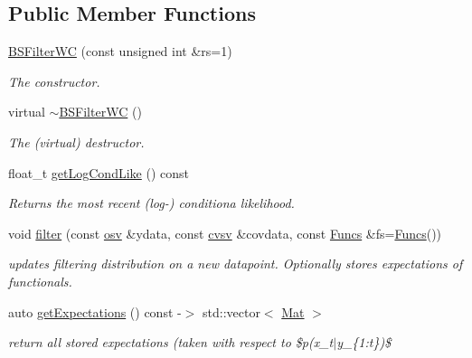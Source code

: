 \subsection*{Public Member Functions}
\begin{DoxyCompactItemize}
\item 
\hyperlink{classBSFilterWC_a8b9399d0b7008aa6bca19a87834dfd6a}{B\+S\+Filter\+WC} (const unsigned int \&rs=1)
\begin{DoxyCompactList}\small\item\em The constructor. \end{DoxyCompactList}\item 
\mbox{\label{classBSFilterWC_a125b13d2ba71b3bce05c315dea38b476}} 
virtual \hyperlink{classBSFilterWC_a125b13d2ba71b3bce05c315dea38b476}{$\sim$\+B\+S\+Filter\+WC} ()
\begin{DoxyCompactList}\small\item\em The (virtual) destructor. \end{DoxyCompactList}\item 
float\+\_\+t \hyperlink{classBSFilterWC_a26e23f7f1e17e3fb3e6a3bfdb633cc2b}{get\+Log\+Cond\+Like} () const
\begin{DoxyCompactList}\small\item\em Returns the most recent (log-\/) conditiona likelihood. \end{DoxyCompactList}\item 
void \hyperlink{classBSFilterWC_a5fcdf06edc3b5528c5c33dd2e3df9b66}{filter} (const \hyperlink{classBSFilterWC_a48b0c7f1a1cf7e57300cf820e74057ce}{osv} \&ydata, const \hyperlink{classBSFilterWC_a52f5a46901a821fffe82937543220a1a}{cvsv} \&covdata, const \hyperlink{classBSFilterWC_a984a5a75eef118f2f4db7f8953fea653}{Funcs} \&fs=\hyperlink{classBSFilterWC_a984a5a75eef118f2f4db7f8953fea653}{Funcs}())
\begin{DoxyCompactList}\small\item\em updates filtering distribution on a new datapoint. Optionally stores expectations of functionals. \end{DoxyCompactList}\item 
auto \hyperlink{classBSFilterWC_abbac1ed7a57f04ec34d389e3ac822a90}{get\+Expectations} () const -\/$>$ std\+::vector$<$ \hyperlink{classBSFilterWC_a507a06203a27e3a025a43be68b4b0e0e}{Mat} $>$
\begin{DoxyCompactList}\small\item\em return all stored expectations (taken with respect to \$p(x\+\_\+t$\vert$y\+\_\+\{1\+:t\})\$ \end{DoxyCompactList}\item 

\end{DoxyCompactItemize}
